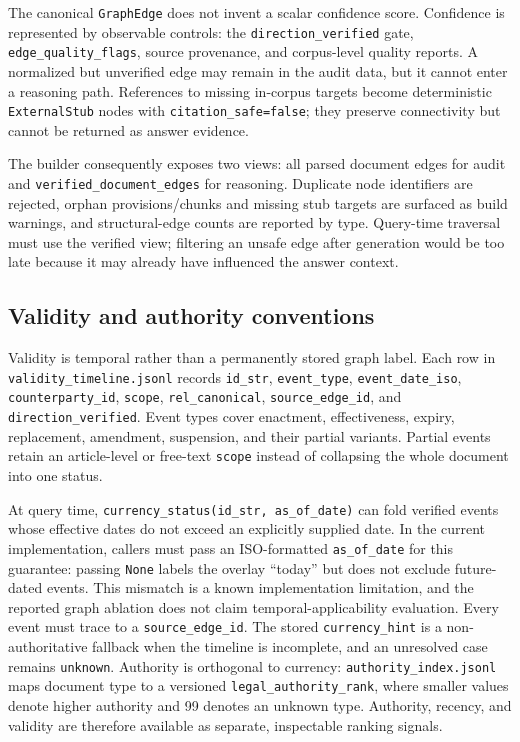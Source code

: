The canonical \texttt{GraphEdge} does not invent a scalar confidence score.
Confidence is represented by observable controls: the
\texttt{direction\_verified} gate, \texttt{edge\_quality\_flags}, source
provenance, and corpus-level quality reports. A normalized but unverified edge
may remain in the audit data, but it cannot enter a reasoning path. References
to missing in-corpus targets become deterministic \texttt{ExternalStub} nodes
with \texttt{citation\_safe=false}; they preserve connectivity but cannot be
returned as answer evidence.

The builder consequently exposes two views: all parsed document edges for
audit and \texttt{verified\_document\_edges} for reasoning. Duplicate node
identifiers are rejected, orphan provisions/chunks and missing stub targets
are surfaced as build warnings, and structural-edge counts are reported by
type. Query-time traversal must use the verified view; filtering an unsafe edge
after generation would be too late because it may already have influenced the
answer context.

\subsection{Validity and authority conventions}

Validity is temporal rather than a permanently stored graph label. Each row in
\texttt{validity\_timeline.jsonl} records
\texttt{id\_str}, \texttt{event\_type}, \texttt{event\_date\_iso},
\texttt{counterparty\_id}, \texttt{scope}, \texttt{rel\_canonical},
\texttt{source\_edge\_id}, and \texttt{direction\_verified}. Event types cover
enactment, effectiveness, expiry, replacement, amendment, suspension, and their
partial variants. Partial events retain an article-level or free-text
\texttt{scope} instead of collapsing the whole document into one status.

At query time, \texttt{currency\_status(id\_str, as\_of\_date)} can fold
verified events whose effective dates do not exceed an explicitly supplied
date. In the current implementation, callers must pass an ISO-formatted
\texttt{as\_of\_date} for this guarantee: passing \texttt{None} labels the
overlay ``today'' but does not exclude future-dated events. This mismatch is a
known implementation limitation, and the reported graph ablation does not
claim temporal-applicability evaluation. Every event must trace to a
\texttt{source\_edge\_id}. The stored \texttt{currency\_hint} is a
non-authoritative fallback when the timeline is incomplete, and an unresolved
case remains \texttt{unknown}. Authority is orthogonal to currency:
\texttt{authority\_index.jsonl} maps document type to a versioned
\texttt{legal\_authority\_rank}, where smaller values denote higher authority
and 99 denotes an unknown type. Authority, recency, and validity are therefore
available as separate, inspectable ranking signals.

